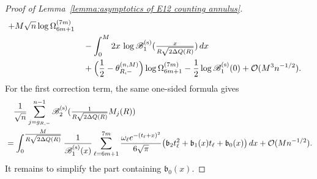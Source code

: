 \documentclass[a4paper]{article}
\numberwithin{equation}{section}
\begin{document}
\begin{proof}[Proof of Lemma~\ref{lemma:asymptotics of E12 counting annulus}]
\begin{align*}
+M\sqrt{n}\log\Omega_{6m+1}^{(7m)}
\\
&\quad
-\int_0^{M}2x\,\log\mathscr{B}_1^{(\rm s)}(\tfrac{x}{R\sqrt{2\Delta Q(R)}})\,dx
\\
&\quad
+\Bigl(\frac{1}{2}-\theta_{R,-}^{(n,M)}\Bigr)\log\Omega_{6m+1}^{(7m)}
-\frac{1}{2}
\log\mathscr{B}_1^{(\rm s)}(0)
+\mathcal{O}(M^3n^{-1/2}). 
\end{align*}
For the first correction term, the same one-sided formula gives
\begin{align*}
 &\quad
\frac{1}{\sqrt{n}}\sum_{j=g_{R,-}}^{n-1}
\mathscr{B}_{2}^{(\rm s)}(\tfrac{1}{R\sqrt{2\Delta Q(R)}}M_j(R))
\\
&=
\int_{0}^{\tfrac{M}{R\sqrt{2\Delta Q(R)}}}
\frac{1}{\mathscr{B}_1^{(\rm s)}(x)}
\sum_{\ell=6m+1}^{7m}
\frac{\omega_{\ell}e^{-(t_{\ell}+x)^2}}{6\sqrt{\pi}}
\bigl( 
\mathfrak{b}_2t_{\ell}^2+\mathfrak{b}_1(x)t_{\ell}+\mathfrak{b}_0(x)
\bigr)
\,dx
+
\mathcal{O}(Mn^{-1/2}). 
\end{align*}
It remains to simplify the part containing $\mathfrak b_0(x)$.

\end{proof}
\end{document}
